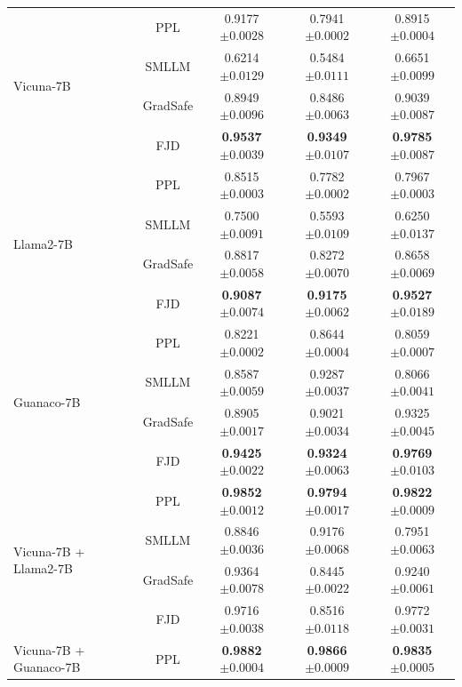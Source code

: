 \documentclass{article}
\begin{document}
\begin{table}
\begin{tabular}{lcccc}
    \midrule
    \multirow{4}{*}{Vicuna-7B} 
    & PPL & 0.9177\tiny{$\pm 0.0028$} & 0.7941\tiny{$\pm 0.0002$} & 0.8915\tiny{$\pm 0.0004$} \\
    & SMLLM & 0.6214\tiny{$\pm 0.0129$} & 0.5484\tiny{$\pm 0.0111$} & 0.6651\tiny{$\pm 0.0099$} \\
    & GradSafe & 0.8949\tiny{$\pm 0.0096$} & 0.8486\tiny{$\pm 0.0063$} & 0.9039\tiny{$\pm 0.0087$}\\
    & FJD & \textbf{0.9537}\tiny{$\pm 0.0039$} &\textbf{0.9349}\tiny{$\pm 0.0107$} &\textbf{0.9785}\tiny{$\pm 0.0087$} \\
    \midrule
    \multirow{4}{*}{Llama2-7B}
    & PPL & 0.8515\tiny{$\pm 0.0003$} & 0.7782\tiny{$\pm 0.0002$} & 0.7967\tiny{$\pm 0.0003$} \\
    & SMLLM & 0.7500\tiny{$\pm 0.0091$} & 0.5593\tiny{$\pm 0.0109$} & 0.6250\tiny{$\pm 0.0137$} \\
    & GradSafe & 0.8817\tiny{$\pm 0.0058$} & 0.8272\tiny{$\pm 0.0070$} & 0.8658\tiny{$\pm 0.0069$}\\
    & FJD & \textbf{0.9087}\tiny{$\pm 0.0074$} & \textbf{0.9175}\tiny{$\pm 0.0062$} & \textbf{0.9527}\tiny{$\pm 0.0189$} \\
    \midrule
    \multirow{4}{*}{Guanaco-7B}
    & PPL & 0.8221\tiny{$\pm 0.0002$} & 0.8644\tiny{$\pm 0.0004$} & 0.8059\tiny{$\pm 0.0007$}  \\
    & SMLLM & 0.8587\tiny{$\pm 0.0059$} & 0.9287\tiny{$\pm 0.0037$} & 0.8066\tiny{$\pm 0.0041$}\\
    & GradSafe & 0.8905\tiny{$\pm 0.0017$} & 0.9021\tiny{$\pm 0.0034$} & 0.9325\tiny{$\pm 0.0045$}\\
    & FJD &\textbf{0.9425}\tiny{$\pm 0.0022$} & \textbf{0.9324}\tiny{$\pm 0.0063$} & \textbf{0.9769}\tiny{$\pm 0.0103$} \\
    \midrule
    \multirow{4}{*}{Vicuna-7B + Llama2-7B}
    & PPL & \textbf{0.9852}\tiny{$\pm 0.0012$} & \textbf{0.9794}\tiny{$\pm 0.0017$} &\textbf{0.9822}\tiny{$\pm 0.0009$} \\
    & SMLLM & 0.8846\tiny{$\pm 0.0036$} & 0.9176\tiny{$\pm 0.0068$} & 0.7951\tiny{$\pm 0.0063$} \\
    & GradSafe & 0.9364\tiny{$\pm 0.0078$} & 0.8445\tiny{$\pm 0.0022$} & 0.9240\tiny{$\pm 0.0061$}\\
    & FJD & 0.9716\tiny{$\pm 0.0038$} & 0.8516\tiny{$\pm 0.0118$} & 0.9772\tiny{$\pm 0.0031$}\\
    \midrule
    \multirow{4}{*}{Vicuna-7B + Guanaco-7B}
    & PPL & \textbf{0.9882}\tiny{$\pm 0.0004$} & \textbf{0.9866}\tiny{$\pm 0.0009$} & \textbf{0.9835}\tiny{$\pm 0.0005$} \\

\end{tabular}
\end{table}
\end{document}
